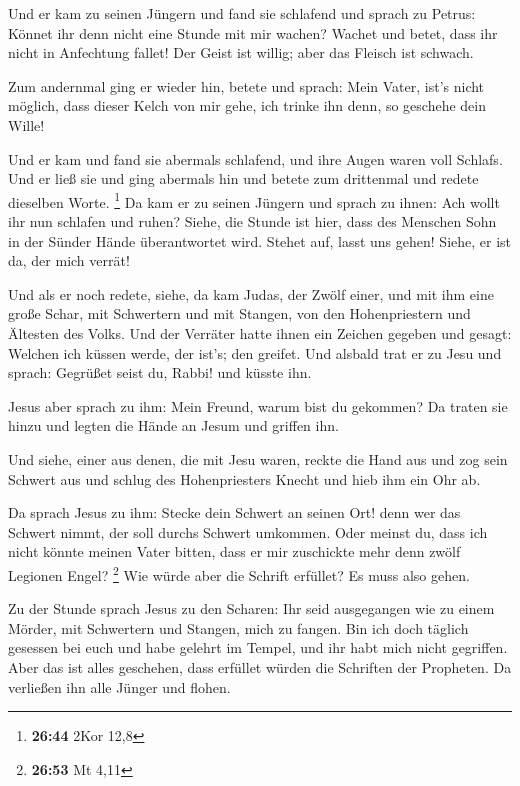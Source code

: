  Und er kam zu seinen Jüngern und fand sie schlafend und
sprach zu Petrus: Könnet ihr denn nicht eine Stunde mit mir wachen?
 Wachet und betet, dass ihr nicht in Anfechtung fallet! Der
Geist ist willig; aber das Fleisch ist schwach.

 Zum andernmal ging er wieder hin, betete und sprach: Mein
Vater, ist's nicht möglich, dass dieser Kelch von mir gehe, ich trinke
ihn denn, so geschehe dein Wille!

 Und er kam und fand sie abermals schlafend, und ihre Augen
waren voll Schlafs.  Und er ließ sie und ging abermals hin
und betete zum drittenmal und redete dieselben Worte. \footnote{\textbf{26:44}
  2Kor 12,8}  Da kam er zu seinen Jüngern und sprach zu
ihnen: Ach wollt ihr nun schlafen und ruhen? Siehe, die Stunde ist hier,
dass des Menschen Sohn in der Sünder Hände überantwortet wird.
 Stehet auf, lasst uns gehen! Siehe, er ist da, der mich
verrät!

 Und als er noch redete, siehe, da kam Judas, der Zwölf
einer, und mit ihm eine große Schar, mit Schwertern und mit Stangen, von
den Hohenpriestern und Ältesten des Volks.  Und der
Verräter hatte ihnen ein Zeichen gegeben und gesagt: Welchen ich küssen
werde, der ist's; den greifet.  Und alsbald trat er zu Jesu
und sprach: Gegrüßet seist du, Rabbi! und küsste ihn.

 Jesus aber sprach zu ihm: Mein Freund, warum bist du
gekommen? Da traten sie hinzu und legten die Hände an Jesum und griffen
ihn.

 Und siehe, einer aus denen, die mit Jesu waren, reckte die
Hand aus und zog sein Schwert aus und schlug des Hohenpriesters Knecht
und hieb ihm ein Ohr ab.

 Da sprach Jesus zu ihm: Stecke dein Schwert an seinen Ort!
denn wer das Schwert nimmt, der soll durchs Schwert umkommen.
 Oder meinst du, dass ich nicht könnte meinen Vater bitten,
dass er mir zuschickte mehr denn zwölf Legionen Engel? \footnote{\textbf{26:53}
  Mt 4,11}  Wie würde aber die Schrift erfüllet? Es muss
also gehen.

 Zu der Stunde sprach Jesus zu den Scharen: Ihr seid
ausgegangen wie zu einem Mörder, mit Schwertern und Stangen, mich zu
fangen. Bin ich doch täglich gesessen bei euch und habe gelehrt im
Tempel, und ihr habt mich nicht gegriffen.  Aber das ist
alles geschehen, dass erfüllet würden die Schriften der Propheten. Da
verließen ihn alle Jünger und flohen.

